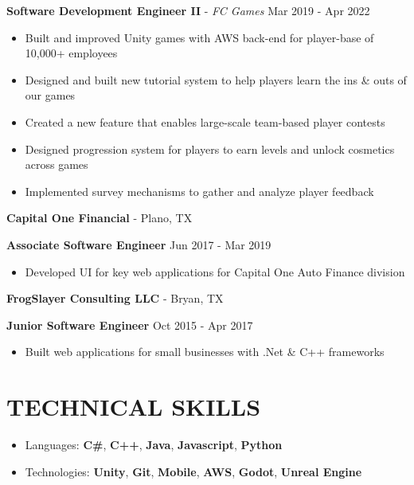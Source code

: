 \documentclass[resmargin,10pt]{res} %
\begin{document}
\begin{resume}
    \begin{ncolumn}{1}
        {\bf Software Development Engineer II} - \textit{FC Games}  \hfill Mar 2019 - Apr 2022
    \end{ncolumn}
    \begin{itemize}
        \setlength\itemsep{-0.1em}
        \item Built and improved Unity games with AWS back-end for player-base of 10,000+ employees
        \item Designed and built new tutorial system to help players learn the ins \& outs of our games
        \item Created a new feature that enables large-scale team-based player contests
        \item Designed progression system for players to earn levels and unlock cosmetics across games
        \item Implemented survey mechanisms to gather and analyze player feedback
    \end{itemize}
    {\bf Capital One Financial} - Plano, TX \\
    \begin{ncolumn}{1}
        {\bf Associate Software Engineer} \hfill Jun 2017 - Mar 2019
    \end{ncolumn}
    \begin{itemize}
        \item Developed UI for key web applications for Capital One Auto Finance division
    \end{itemize}
    {\bf FrogSlayer Consulting LLC} - Bryan, TX \\
    \begin{ncolumn}{1}
        {\bf Junior Software Engineer} \hfill Oct 2015 - Apr 2017
    \end{ncolumn}
    \begin{itemize}
        \setlength\itemsep{-0.0em}
        \item  Built web applications for small businesses with .Net \& C++ frameworks
    \end{itemize}

    \section{TECHNICAL SKILLS}
    \begin{itemize}
        \setlength\itemsep{0.1em}
        \item[] {\large Languages:} \textbf{C\#}, \textbf{C++}, \textbf{Java}, \textbf{Javascript}, \textbf{Python}
        \item[] {\large Technologies:} \textbf{Unity}, \textbf{Git}, \textbf{Mobile}, \textbf{AWS}, \textbf{Godot}, \textbf{Unreal Engine}
    \end{itemize}

\end{resume}
\end{document}
